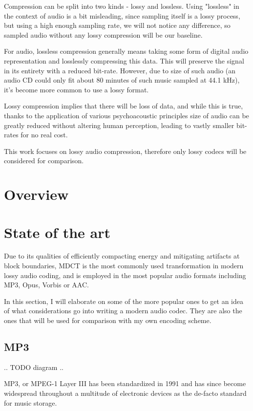 Compression can be split into two kinds - lossy and lossless. Using "lossless" in the context of audio is a bit misleading, since sampling itself is a lossy process, but using a high enough sampling rate, we will not notice any difference, so sampled audio without any lossy compression will be our baseline.

For audio, lossless compression generally means taking some form of digital audio representation and losslessly compressing this data. This will preserve the signal in its entirety with a reduced bit-rate. However, due to size of such audio (an audio CD could only fit about 80 minutes of such music sampled at 44.1 kHz), it's become more common to use a lossy format.

Lossy compression implies that there will be loss of data, and while this is true, thanks to the application of various psychoacoustic principles size of audio can be greatly reduced without altering human perception, leading to vastly smaller bit-rates for no real cost.

This work focuses on lossy audio compression, therefore only lossy codecs will be considered for comparison.

\section{Overview}

\section{State of the art}
Due to its qualities of efficiently compacting energy and mitigating artifacts at block boundaries, MDCT is the most commonly used transformation in modern lossy audio coding, and is employed in the most popular audio formats including MP3, Opus, Vorbis or AAC.

In this section, I will elaborate on some of the more popular ones to get an idea of what considerations go into writing a modern audio codec. They are also the ones that will be used for comparison with my own encoding scheme.

\subsection{MP3}
.. TODO diagram ..

MP3, or MPEG-1 Layer III has been standardized in 1991 and has since become widespread throughout a multitude of electronic devices as the de-facto standard for music storage.

